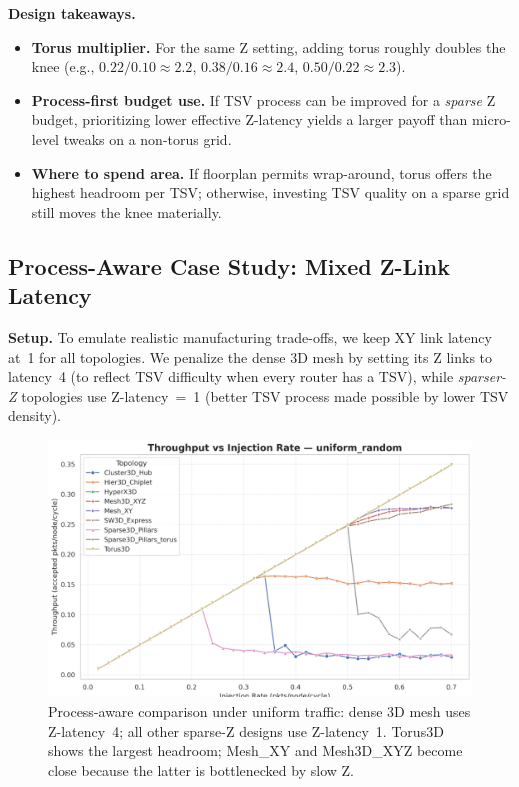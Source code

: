 \documentclass[11pt]{article}
\begin{document}
\noindent\textbf{Design takeaways.}
\begin{itemize}[leftmargin=1.2em]
  \item \textbf{Torus multiplier.} For the same Z setting, adding torus roughly doubles the knee
        (e.g., $0.22/0.10\!\approx\!2.2$, $0.38/0.16\!\approx\!2.4$, $0.50/0.22\!\approx\!2.3$).
  \item \textbf{Process-first budget use.} If TSV process can be improved for a \emph{sparse} Z budget,
        prioritizing lower effective Z-latency yields a larger payoff than micro-level tweaks on a non-torus grid.
  \item \textbf{Where to spend area.} If floorplan permits wrap-around, torus offers the highest headroom per TSV;
        otherwise, investing TSV quality on a sparse grid still moves the knee materially.
\end{itemize}

\subsection{Process-Aware Case Study: Mixed Z-Link Latency}
\label{subsec:process-aware-mixed-z}

\textbf{Setup.} To emulate realistic manufacturing trade-offs, we keep XY link latency at~1
for all topologies. We penalize the dense 3D mesh by setting its Z links to latency~4
(to reflect TSV difficulty when every router has a TSV), while \emph{sparser-Z} topologies
use Z-latency~=~1 (better TSV process made possible by lower TSV density).

\begin{figure}[htbp]
  \centering
  \includegraphics[width=.92\linewidth]{./figs/overview_mixed_zlatency.png}
  \caption{Process-aware comparison under uniform traffic:
  dense 3D mesh uses Z-latency~4; all other sparse-Z designs use Z-latency~1.
  Torus3D shows the largest headroom; Mesh\_XY and Mesh3D\_XYZ become close because
  the latter is bottlenecked by slow Z.}
  \label{fig:process-aware-overview}
\end{figure}
\end{document}
